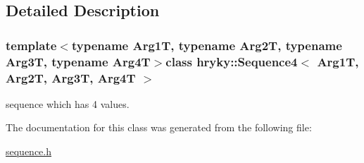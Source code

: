 \subsection{Detailed Description}
\subsubsection*{template$<$typename Arg1\-T, typename Arg2\-T, typename Arg3\-T, typename Arg4\-T$>$class hryky\-::\-Sequence4$<$ Arg1\-T, Arg2\-T, Arg3\-T, Arg4\-T $>$}

sequence which has 4 values. 

The documentation for this class was generated from the following file\-:\begin{DoxyCompactItemize}
\item 
\hyperlink{sequence_8h}{sequence.\-h}\end{DoxyCompactItemize}
